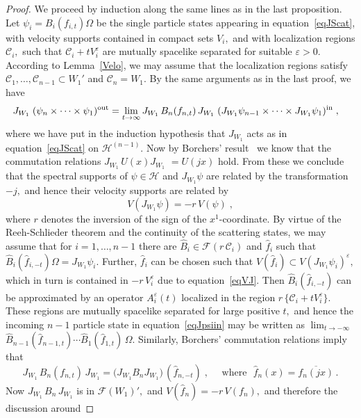 \documentclass[a4paper,reqno,11pt]{amsart}
\theoremstyle{plain}
\theoremstyle{definition}
\numberwithin{equation}{section}
\newcommand{\F}{{\mathcal F}}
\newcommand{\calH}{{\mathcal H}}
\newcommand{\calC}{{\mathcal C}}
\newcommand{\eps}{\varepsilon}
\newcommand{\Om}{\Omega}
\newcommand{\In}{{\rm in} }
\newcommand{\JWR}{J_{W_1}}  %
\newcommand{\cone}{\calC}   %
\begin{document}
\begin{proof}
We proceed by induction along the same lines as in the last
proposition. Let $\psi_i=B_i(f_{i,t})\Om$  be the single particle states 
appearing in equation~\eqref{eqJScat}, 
with velocity supports contained in
compact sets $V_i,$ and with localization regions $\cone_i,$ such that 
$\cone_i+tV_i^\eps$ are mutually spacelike separated for suitable $\eps>0.$   
According to Lemma~\ref{Velo}, we may assume that the localization
regions satisfy $\cone_1,\dots,\cone_{n-1}\subset W_1'$ and $\cone_n= W_1.$ 
By the same arguments as in the last proof, we have 
\begin{align}  
\JWR\;(\psi_n\times\cdots\times\psi_1)^{{\rm out}}&=
\lim_{t\to\infty} \JWR\,B_n(f_{n,t})\,\JWR\;
(\JWR\psi_{n-1}\times\cdots\times\JWR\psi_1)^{{\In}} \;, \label{eqJpsiin}
\end{align}
where we have put in the induction hypothesis that $\JWR$ acts as in 
equation~\eqref{eqJScat} on $\calH^{(n-1)}.$ Now by Borchers'
result~\cite{Borch92}  
we know that the  commutation relations $\JWR\,U(x)\JWR$ $=U(jx)$ hold. 
From these we conclude that the spectral supports of
$\psi\in\calH$ and $\JWR\psi$ are related by the transformation $-j,$ and
hence their velocity supports are related by 
\begin{equation} \label{eqVJ} 
V(\JWR\psi)=  -r\,V(\psi) \;, 
\end{equation}
where $r$ denotes the inversion of the sign of the $x^1$-coordinate.  
By virtue of the Reeh-Schlieder theorem and the continuity of the
scattering states, we may assume that for $i=1,\ldots,n-1$ 
there are $\hat{B}_i\in\F(r\,\cone_i)$ and $\hat{f}_i$ such that 
$\hat{B}_i(\hat{f}_{i,-t})\Omega=\JWR\psi_i.$ Further, $\hat{f}_i$ can
be chosen such that $V(\hat{f}_i)\subset V(\JWR\psi_i)^\eps,$ which in
turn is contained in  $-r\,V_i^\eps$ due to equation~\eqref{eqVJ}.
Then $\hat{B}_i(\hat{f}_{i,-t})$ can be approximated by an operator 
$A^\eps_i(t)$ localized in the region $r\,\{\cone_i+tV_i^\eps\}.$ 
These regions are mutually spacelike separated for large positive 
$t,$ and hence the incoming 
$n-1$ particle state in equation~\eqref{eqJpsiin} may be  written
as $\lim_{t\rightarrow-\infty}$ 
$\hat{B}_{n-1}(\hat{f}_{n-1,t})\cdots \hat{B}_1(\hat{f}_{1,t})\,\Omega.$ 
Similarly, Borchers' commutation relations imply that 
\[  
\JWR\,B_n(f_{n,t})\,\JWR =
\big(\JWR B_n \JWR\big)\,(\hat{f}_{n,-t})\;,
\quad\text{  where } \,\,\hat{f}_n(x)=\overline{f_n(jx)}\,.
\]
Now $\JWR\,B_n\,\JWR$ is in $\F(W_1)',$ and $V(\hat{f}_n)=-r\,V(f_n),$ 
and therefore the discussion around 

\end{proof}
\end{document}

